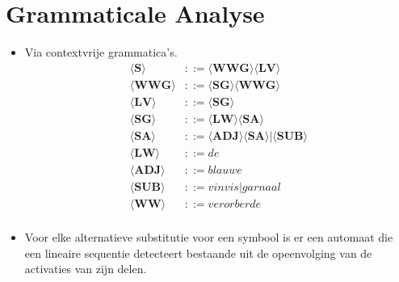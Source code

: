 \section{Grammaticale Analyse}
\begin{itemize}
    \item Via contextvrije grammatica's.
    \begin{align*}
        \langle\textbf{S}\rangle &::= \langle\textbf{WWG}\rangle\langle\textbf{LV}\rangle \\
        \langle\textbf{WWG}\rangle &::= \langle\textbf{SG}\rangle\langle\textbf{WWG}\rangle \\
        \langle\textbf{LV}\rangle &::= \langle\textbf{SG}\rangle \\
        \langle\textbf{SG}\rangle &::= \langle\textbf{LW}\rangle\langle\textbf{SA}\rangle \\
        \langle\textbf{SA}\rangle &::= \langle\textbf{ADJ}\rangle\langle\textbf{SA}\rangle|\langle\textbf{SUB}\rangle \\
        \langle\textbf{LW}\rangle &::=  de\\
        \langle\textbf{ADJ}\rangle &::= blauwe\\
        \langle\textbf{SUB}\rangle &::=  vinvis|garnaal\\
        \langle\textbf{WW}\rangle &::= verorberde\\
    \end{align*}
    \item Voor elke alternatieve substitutie voor een symbool is er een automaat die een lineaire sequentie detecteert bestaande uit de opeenvolging van de activaties van zijn delen.
    
\end{itemize}